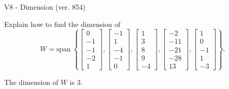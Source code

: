 \begin{exercise}
  \begin{exerciseTitle}V8 - Dimension (ver. 854)\end{exerciseTitle}
  \begin{exerciseStatement}
    Explain how to find the dimension of 
\[W=\mathrm{span}\ \left\{\left[\begin{array}{r}
0 \\
-1 \\
-1 \\
-2 \\
1
\end{array}\right] , \left[\begin{array}{r}
-1 \\
1 \\
-4 \\
-1 \\
0
\end{array}\right] , \left[\begin{array}{r}
1 \\
3 \\
8 \\
9 \\
-4
\end{array}\right] , \left[\begin{array}{r}
-2 \\
-11 \\
-21 \\
-28 \\
13
\end{array}\right] , \left[\begin{array}{r}
1 \\
0 \\
-1 \\
1 \\
-3
\end{array}\right]\right\}.\]



  \end{exerciseStatement}
  \begin{exerciseAnswer}
   The dimension of \(W\) is  \(3\).
  


  \end{exerciseAnswer}
\end{exercise}